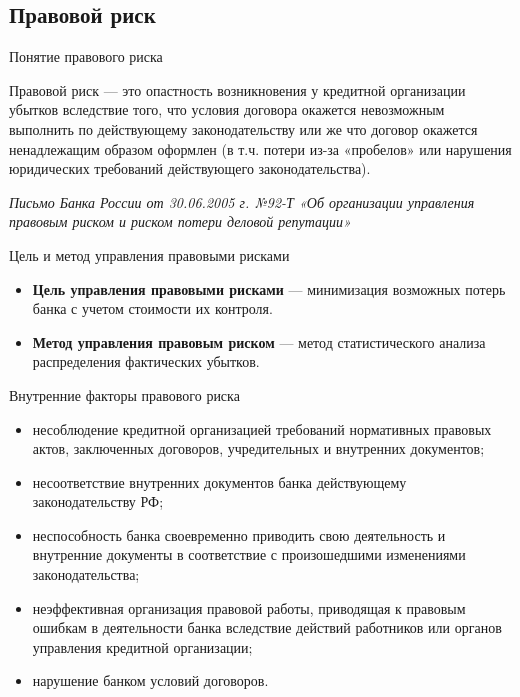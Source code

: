 \documentclass[financial_risks_lectures.tex]{subfiles}
\begin{document}
\subsection{Правовой риск}
\begin{frame}{Понятие правового риска}
\begin{block}{Правовой риск}
\quad — это опастность возникновения у кредитной организации убытков вследствие того, что условия договора окажется невозможным выполнить по действующему законодательству или же что договор окажется ненадлежащим образом оформлен (в т.ч. потери из-за «пробелов» или нарушения юридических требований действующего законодательства).
\end{block}
\textit{Письмо Банка России от 30.06.2005 г. №92-Т «Об организации управления правовым риском и риском потери деловой репутации»}
\end{frame}

\begin{frame}{Цель и метод управления правовыми рисками}
\begin{itemize}[<+->]
\item
\textbf{Цель управления правовыми рисками }— минимизация возможных потерь банка с учетом стоимости их контроля.
\item
\textbf{Метод управления правовым риском }— метод статистического анализа распределения фактических убытков.
\end{itemize}
\end{frame}


\begin{frame}[shrink=15]{Внутренние факторы правового риска}
\begin{itemize}[<+->]
\item
несоблюдение кредитной организацией требований нормативных правовых актов, заключенных договоров, учредительных и внутренних документов;
\item
несоответствие внутренних документов банка действующему законодательству РФ;
\item
неспособность банка своевременно приводить свою деятельность и внутренние документы в соответствие с произошедшими изменениями законодательства;
\item
неэффективная организация правовой работы, приводящая к правовым ошибкам в деятельности банка вследствие действий работников или органов управления кредитной организации;
\item
нарушение банком условий договоров.
\end{itemize}
\end{frame}
\end{document}
